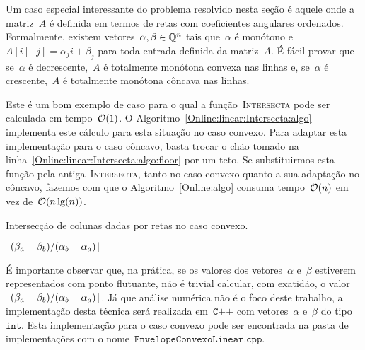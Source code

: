 Um caso especial interessante do problema resolvido nesta seção é aquele onde a matriz~$A$ é definida em termos de retas com coeficientes angulares ordenados. Formalmente, existem vetores~$\alpha,\beta \in \mathbb{Q}^n$ tais que~$\alpha$ é monótono e~$A[i][j] = \alpha_j i + \beta_j$ para toda entrada definida da matriz~$A$. É fácil provar que se~$\alpha$ é decrescente,~$A$ é totalmente monótona convexa nas linhas e, se~$\alpha$ é crescente,~$A$ é totalmente monótona côncava nas linhas.

Este é um bom exemplo de caso para o qual a função~\textsc{Intersecta} pode ser calculada em tempo~$\mathcal{O}(1)$. O Algoritmo~\ref{Online:linear:Intersecta:algo} implementa este cálculo para esta situação no caso convexo. Para adaptar esta implementação para o caso côncavo, basta trocar o chão tomado na linha~\ref{Online:linear:Intersecta:algo:floor} por um teto. Se substituirmos esta função pela antiga~\textsc{Intersecta}, tanto no caso convexo quanto a sua adaptação no côncavo, fazemos com que o Algoritmo~\ref{Online:algo} consuma tempo~$\mathcal{O}(n)$ em vez de~$\mathcal{O}(n\lg(n))$.


\begin{algorithm}[h]
\caption{Intersecção de colunas dadas por retas no caso convexo. }
\label{Online:linear:Intersecta:algo}
\begin{algorithmic}[1]
    \State \Return $\lfloor(\beta_a - \beta_b)/(\alpha_b - \alpha_a)\rfloor$ \label{Online:linear:Intersecta:algo:floor}
\EndFunction
\end{algorithmic}
\end{algorithm}

É importante observar que, na prática, se os valores dos vetores~$\alpha$ e~$\beta$ estiverem representados com ponto flutuante, não é trivial calcular, com exatidão, o valor~$\lfloor(\beta_a - \beta_b)/(\alpha_b - \alpha_a)\rfloor$. Já que análise numérica não é o foco deste trabalho, a implementação desta técnica será realizada em~$\texttt{C++}$ com vetores~$\alpha$ e~$\beta$ do tipo~$\texttt{int}$. Esta implementação para o caso convexo pode ser encontrada na pasta de implementações com o nome~$\texttt{EnvelopeConvexoLinear.cpp}$.
